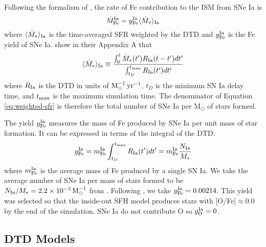 \documentclass[twocolumn,twocolappendix,linenumbers,trackchanges]{aastex631}
\begin{document}
Following the formalism of \citet{Weinberg2017-ChemicalEquilibrium}, the rate of Fe contribution to the ISM from SNe Ia is 
\begin{equation}
    \dot M_{\rm Fe}^{\rm Ia} = y_{\rm Fe}^{\rm Ia} \langle \dot M_*\rangle_{\rm Ia} \\
\end{equation}
where $\langle \dot M_*\rangle_{\rm Ia}$ is the time-averaged SFR weighted by the DTD and $y_{\rm Fe}^{\rm Ia}$ is the Fe yield of SNe Ia. \citet{Weinberg2017-ChemicalEquilibrium} show in their Appendix A that
\begin{equation}
    \langle \dot M_*\rangle_{\rm Ia} \equiv \frac{\int_0^t \dot M_*(t')R_{\rm Ia}(t-t')dt'}{\int_{t_D}^{t_{\rm max}} R_{\rm Ia}(t')dt'}
    \label{eq:weighted-sfr}
\end{equation}
where %
$R_{\rm Ia}$ is the DTD in units of ${\rm M}_\odot^{-1}\,{\rm yr}^{-1}$,
$t_D$ is the minimum SN Ia delay time, and $t_{\rm max}$ is the maximum simulation time. The denominator of Equation \ref{eq:weighted-sfr} is therefore the total number of SNe Ia per M$_{\odot}$ of stars formed.

The yield $y_{\rm Fe}^{\rm Ia}$ measures the mass of Fe produced by SNe Ia per unit mass of star formation. It can be expressed in terms of the integral of the DTD:
\begin{equation}
    y_{\rm Fe}^{\rm Ia} = m_{\rm Fe}^{\rm Ia} \int_{t_D}^{t_{\rm max}} R_{\rm Ia}(t')dt' = m_{\rm Fe}^{\rm Ia} \frac{N_{\rm Ia}}{M_*}
    \label{eq:dtd-integral}
\end{equation}
where $m_{\rm Fe}^{\rm Ia}$ is the average mass of Fe produced by a single SN Ia. We take the average number of SNe Ia per mass of stars formed to be $N_{\rm Ia}/M_*=2.2\times10^{-3}\,{\rm M}_\odot^{-1}$ from \citet{MaozMannucci2012-SNeIaReview}.%
Following \citet{Johnson2021-Migration}, we take $y_{\rm Fe}^{\rm Ia}=0.00214$. This yield was selected so that the inside-out SFH model produces stars with [O/Fe]$\approx 0.0$ by the end of the simulation. SNe Ia do not contribute O so $y_{\rm O}^{\rm Ia}=0$.

\subsection{DTD Models}
\label{sec:dtd-models}
\end{document}
